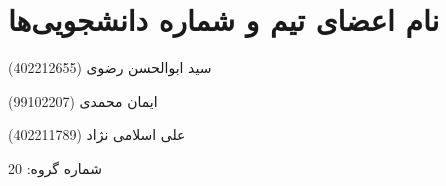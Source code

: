 \section*{نام اعضای تیم و شماره دانشجویی‌ها}

سید ابوالحسن رضوی (402212655)

ایمان محمدی (99102207)

علی اسلامی نژاد (402211789)

شماره گروه: 20